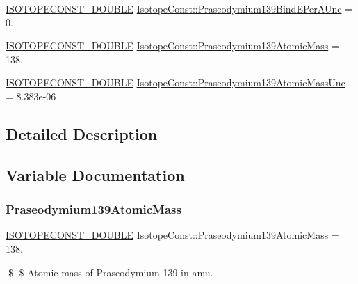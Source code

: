 \begin{DoxyCompactItemize}
\item 
\mbox{\hyperlink{group___isotope_const-_macros_ga8f45a7272ce02c0b4c65c44636ed719a}{I\+S\+O\+T\+O\+P\+E\+C\+O\+N\+S\+T\+\_\+\+D\+O\+U\+B\+LE}} \mbox{\hyperlink{group___isotope_const-_praseodymium-_pr139_ga1b32417f16a3b77ee866d5d83477943c}{Isotope\+Const\+::\+Praseodymium139\+Bind\+E\+Per\+A\+Unc}} = 0.
\item 
\mbox{\hyperlink{group___isotope_const-_macros_ga8f45a7272ce02c0b4c65c44636ed719a}{I\+S\+O\+T\+O\+P\+E\+C\+O\+N\+S\+T\+\_\+\+D\+O\+U\+B\+LE}} \mbox{\hyperlink{group___isotope_const-_praseodymium-_pr139_ga47c7906ca8a3cff1732c1e2a2b9599ab}{Isotope\+Const\+::\+Praseodymium139\+Atomic\+Mass}} = 138.
\item 
\mbox{\hyperlink{group___isotope_const-_macros_ga8f45a7272ce02c0b4c65c44636ed719a}{I\+S\+O\+T\+O\+P\+E\+C\+O\+N\+S\+T\+\_\+\+D\+O\+U\+B\+LE}} \mbox{\hyperlink{group___isotope_const-_praseodymium-_pr139_gabf8cbe3eb38df71fe5e16ff93fc75328}{Isotope\+Const\+::\+Praseodymium139\+Atomic\+Mass\+Unc}} = 8.\+383e-\/06
\end{DoxyCompactItemize}


\subsection{Detailed Description}


\subsection{Variable Documentation}
\mbox{\label{group___isotope_const-_praseodymium-_pr139_ga47c7906ca8a3cff1732c1e2a2b9599ab}} 
\subsubsection{\texorpdfstring{Praseodymium139\+Atomic\+Mass}{Praseodymium139AtomicMass}}
{\footnotesize\ttfamily \mbox{\hyperlink{group___isotope_const-_macros_ga8f45a7272ce02c0b4c65c44636ed719a}{I\+S\+O\+T\+O\+P\+E\+C\+O\+N\+S\+T\+\_\+\+D\+O\+U\+B\+LE}} Isotope\+Const\+::\+Praseodymium139\+Atomic\+Mass = 138.}

\$ \$ Atomic mass of Praseodymium-\/139 in amu. \mbox{\label{group___isotope_const-_praseodymium-_pr139_gabf8cbe3eb38df71fe5e16ff93fc75328}} 
